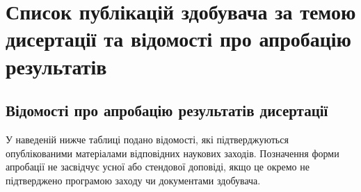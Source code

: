 \appendix
\renewcommand{\chaptername}{Додаток}
\chapter{Список публікацій здобувача за темою дисертації та відомості про апробацію результатів}
\label{app:publications_and_approbation}



\section*{Відомості про апробацію результатів дисертації}

У наведеній нижче таблиці подано відомості, які підтверджуються опублікованими матеріалами відповідних наукових заходів. Позначення форми апробації не засвідчує усної або стендової доповіді, якщо це окремо не підтверджено програмою заходу чи документами здобувача.

